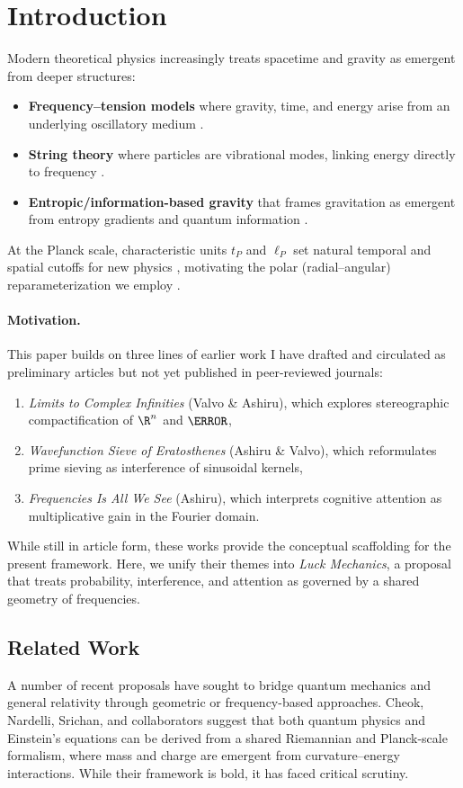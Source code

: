 \documentclass[12pt]{article}
\theoremstyle{plain}
\theoremstyle{definition}
\begin{document}
\section{Introduction}
Modern theoretical physics increasingly treats spacetime and gravity as emergent from deeper structures:
\begin{itemize}[leftmargin=1.1em]
  \item \textbf{Frequency–tension models} where gravity, time, and energy arise from an underlying oscillatory medium \citep{STheory}.
  \item \textbf{String theory} where particles are vibrational modes, linking energy directly to frequency \citep{Backreaction}.
  \item \textbf{Entropic/information-based gravity} that frames gravitation as emergent from entropy gradients and quantum information \citep{EntropicGravity}.
\end{itemize}
At the Planck scale, characteristic units \(t_P\) and \(\ell_P\) set natural temporal and spatial cutoffs for new physics \citep{PlanckUnits}, motivating the polar (radial–angular) reparameterization we employ \citep{PolarCoords}.

\paragraph{Motivation.}  
This paper builds on three lines of earlier work I have drafted and circulated as preliminary articles but not yet published in peer-reviewed journals:
\begin{enumerate}[leftmargin=1.1em]
    \item \emph{Limits to Complex Infinities} (Valvo \& Ashiru), which explores stereographic compactification of $\R^n$ and $\C$,
    \item \emph{Wavefunction Sieve of Eratosthenes} (Ashiru \& Valvo), which reformulates prime sieving as interference of sinusoidal kernels,
    \item \emph{Frequencies Is All We See} (Ashiru), which interprets cognitive attention as multiplicative gain in the Fourier domain.
\end{enumerate}
While still in article form, these works provide the conceptual scaffolding for the present framework. Here, we unify their themes into \emph{Luck Mechanics}, a proposal that treats probability, interference, and attention as governed by a shared geometry of frequencies.

\subsection{Related Work}
A number of recent proposals have sought to bridge quantum mechanics and general relativity through geometric or frequency-based approaches.  
Cheok, Nardelli, Srichan, and collaborators \citep{Cheok2025} suggest that both quantum physics and Einstein’s equations can be derived from a shared Riemannian and Planck-scale formalism, where mass and charge are emergent from curvature–energy interactions. While their framework is bold, it has faced critical scrutiny.  
\end{document}
